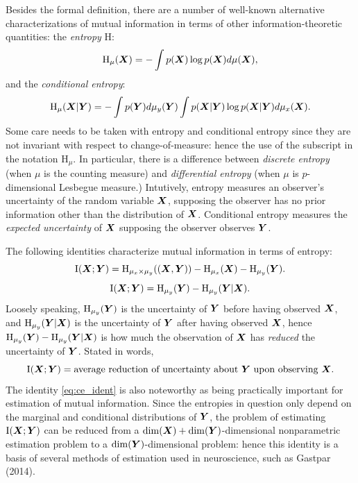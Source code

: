 Besides the formal definition, there are a number of well-known alternative
characterizations of mutual information in terms of other
information-theoretic quantities: the \emph{entropy} $\text{H}$:
\[
\text{H}_\mu(\boldsymbol{X}) = -\int p(\boldsymbol{X}) \log p(\boldsymbol{X}) d\mu(\boldsymbol{X}),
\]
and the \emph{conditional entropy}:
\[
\text{H}_\mu(\boldsymbol{X}|\boldsymbol{Y}) = -\int p(\boldsymbol{Y}) d\mu_y(\boldsymbol{Y}) \int p(\boldsymbol{X}|\boldsymbol{Y}) \log p(\boldsymbol{X}|\boldsymbol{Y}) d\mu_x(\boldsymbol{X}).
\]
Some care needs to be taken with entropy and conditional entropy since
they are not invariant with respect to change-of-measure: hence the
use of the subscript in the notation $\text{H}_\mu$.  In particular,
there is a difference between \emph{discrete entropy} (when $\mu$ is
the counting measure) and \emph{differential entropy} (when $\mu$ is
$p$-dimensional Lesbegue measure.)  Intutively, entropy measures an
observer's uncertainty of the random variable $\boldsymbol{X}$, supposing the
observer has no prior information other than the distribution of
$\boldsymbol{X}$. Conditional entropy measures the \emph{expected uncertainty} of
$\boldsymbol{X}$ supposing the observer observes $\boldsymbol{Y}$.

The following identities characterize mutual information in terms of entropy:
\[
\text{I}(\boldsymbol{X}; \boldsymbol{Y}) = \text{H}_{\mu_x \times \mu_y}((\boldsymbol{X}, \boldsymbol{Y})) - \text{H}_{\mu_x}(\boldsymbol{X}) - \text{H}_{\mu_y}(\boldsymbol{Y}).
\]
\begin{equation}\label{eq:ce_ident}
\text{I}(\boldsymbol{X}; \boldsymbol{Y}) = \text{H}_{\mu_y}(\boldsymbol{Y}) - \text{H}_{\mu_y}(\boldsymbol{Y}|\boldsymbol{X}).
\end{equation}
Loosely speaking, $\text{H}_{\mu_y}(\boldsymbol{Y})$ is the uncertainty of $\boldsymbol{Y}$
before having observed $\boldsymbol{X}$, and $\text{H}_{\mu_y}(\boldsymbol{Y}|\boldsymbol{X})$ is the
uncertainty of $\boldsymbol{Y}$ after having observed $\boldsymbol{X}$, hence
$\text{H}_{\mu_y}(\boldsymbol{Y}) - \text{H}_{\mu_y}(\boldsymbol{Y}|\boldsymbol{X})$ is how much the
observation of $\boldsymbol{X}$ has \emph{reduced} the uncertainty of $\boldsymbol{Y}$.
Stated in words,
\[
\text{I}(\boldsymbol{X}; \boldsymbol{Y}) = \text{average reduction of uncertainty about $\boldsymbol{Y}$ upon observing $\boldsymbol{X}$}.
\]
The identity \eqref{eq:ce_ident} is also noteworthy
as being practically important for estimation of mutual information.
Since the entropies in question only depend on the marginal and
conditional distributions of $\boldsymbol{Y}$, the problem of estimating
$\text{I}(\boldsymbol{X}; \boldsymbol{Y})$ can be reduced from a $\dim(\boldsymbol{X})
+ \dim(\boldsymbol{Y})$-dimensional nonparametric estimation problem to a
$\dim(\boldsymbol{Y})$-dimensional problem: hence this identity is a basis of
several methods of estimation used in neuroscience, such as Gastpar
(2014).


